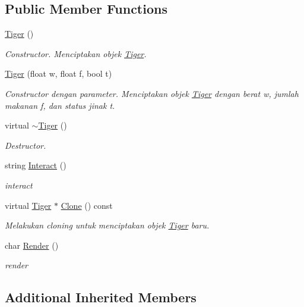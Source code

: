 \subsection*{Public Member Functions}
\begin{DoxyCompactItemize}
\item 
\hyperlink{classTiger_ab2b455a0cdbd21f2052eef2a176f0eeb}{Tiger} ()
\begin{DoxyCompactList}\small\item\em Constructor. Menciptakan objek \hyperlink{classTiger}{Tiger}. \end{DoxyCompactList}\item 
\hyperlink{classTiger_ade1e562b2af36ee2838d3bc6dc95042b}{Tiger} (float w, float f, bool t)
\begin{DoxyCompactList}\small\item\em Constructor dengan parameter. Menciptakan objek \hyperlink{classTiger}{Tiger} dengan berat w, jumlah makanan f, dan status jinak t. \end{DoxyCompactList}\item 
virtual \hyperlink{classTiger_ae9a0109993b438dd7405b4018ba62d4b}{$\sim$\+Tiger} ()
\begin{DoxyCompactList}\small\item\em Destructor. \end{DoxyCompactList}\item 
string \hyperlink{classTiger_ae318cc373300a52e13598f42368a2c70}{Interact} ()
\begin{DoxyCompactList}\small\item\em interact \end{DoxyCompactList}\item 
virtual \hyperlink{classTiger}{Tiger} $\ast$ \hyperlink{classTiger_aa376d57a4b2d56edb586f7ba1b170037}{Clone} () const 
\begin{DoxyCompactList}\small\item\em Melakukan cloning untuk menciptakan objek \hyperlink{classTiger}{Tiger} baru. \end{DoxyCompactList}\item 
char \hyperlink{classTiger_a42b09a0bfc8c115e7383e926513fb371}{Render} ()
\begin{DoxyCompactList}\small\item\em render \end{DoxyCompactList}\end{DoxyCompactItemize}
\subsection*{Additional Inherited Members}


